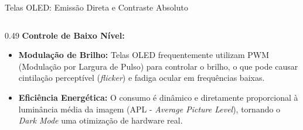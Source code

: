 \begin{frame}{Telas OLED: Emissão Direta e Contraste Absoluto}
{\begin{columns}[T]
            \begin{column}{0.49\textwidth}    
                \textbf{Controle de Baixo Nível:}
                \begin{itemize}
                    \setlength{\itemsep}{1pt}
                    \item \textbf{Modulação de Brilho:} Telas OLED frequentemente utilizam PWM (Modulação por Largura de Pulso) para controlar o brilho, o que pode causar cintilação perceptível (\textit{flicker}) e fadiga ocular em frequências baixas.
                    \item \textbf{Eficiência Energética:} O consumo é dinâmico e diretamente proporcional à luminância média da imagem (APL - \textit{Average Picture Level}), tornando o \textit{Dark Mode} uma otimização de hardware real.
                \end{itemize}
            \end{column}
        \end{columns}
    }
\end{frame}